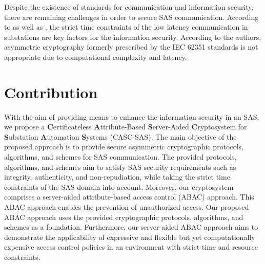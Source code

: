 Despite the existence of standards for communication and information security, there are remaining challenges in order to secure SAS communication.
According to \citeauthor{Ishchenko2018} \cite{Ishchenko2018} as well as \citeauthor{Elbez2019} \cite{Elbez2019}, the strict time constraints of the low latency communication in substations are key factors for the information security.
According to the authors, asymmetric cryptography formerly prescribed by the IEC 62351 standards is not appropriate due to computational complexity and latency.

\section{Contribution}
\label{sec:contribution}
With the aim of providing means to enhance the information security in an SAS, we propose a \textbf{C}ertificateless \textbf{A}ttribute-Based \textbf{S}erver-Aided \textbf{C}ryptosystem for \textbf{S}ubstation \textbf{A}utomation \textbf{S}ystems (CASC-SAS).
The main objective of the proposed approach is to provide secure asymmetric cryptographic protocols, algorithms, and schemes for SAS communication.
The provided protocols, algorithms, and schemes aim to satisfy SAS security requirements such as integrity, authenticity, and non-repudiation, while taking the strict time constraints of the SAS domain into account.
Moreover, our cryptosystem comprises a server-aided attribute-based access control (ABAC) approach.
This ABAC approach enables the prevention of unauthorized access.
Our proposed ABAC approach uses the provided cryptographic protocols, algorithms, and schemes as a foundation.
Furthermore, our server-aided ABAC approach aims to demonstrate the applicability of expressive and flexible but yet computationally expensive access control policies in an environment with strict time and resource constraints.

